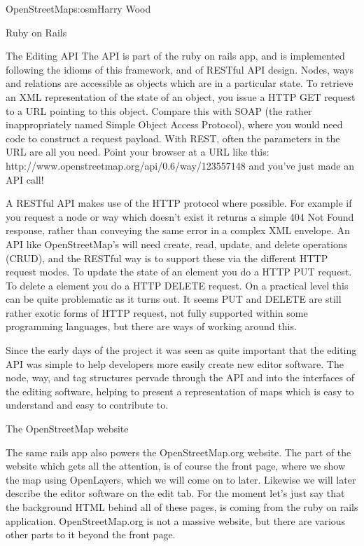 \begin{aosachapter}{OpenStreetMap}{s:osm}{Harry Wood}
\begin{aosasect1}{Ruby on Rails}
\begin{aosasect2}{The Editing API}
The API is part of the ruby on rails app, and is implemented following
the idioms of this framework, and of RESTful API design. Nodes, ways
and relations are accessible as objects which are in a particular
state. To retrieve an XML representation of the state of an object,
you issue a HTTP GET request to a URL pointing to this object. Compare
this with SOAP (the rather inappropriately named Simple Object Access
Protocol), where you would need code to construct a request
payload. With REST, often the parameters in the URL are all you
need. Point your browser at a URL like this:
http://www.openstreetmap.org/api/0.6/way/123557148 and you've just
made an API call!

A RESTful API makes use of the HTTP protocol where possible. For
example if you request a node or way which doesn't exist it returns a
simple 404 Not Found response, rather than conveying the same error in
a complex XML envelope. An API like OpenStreetMap's will need create,
read, update, and delete operations (CRUD), and the RESTful way is to
support these via the different HTTP request modes. To update the
state of an element you do a HTTP PUT request. To delete a element you
do a HTTP DELETE request. On a practical level this can be quite
problematic as it turns out. It seems PUT and DELETE are still rather
exotic forms of HTTP request, not fully supported within some
programming languages, but there are ways of working around this.

Since the early days of the project it was seen as quite important
that the editing API was simple to help developers more easily create
new editor software. The node, way, and tag structures pervade through
the API and into the interfaces of the editing software, helping to
present a representation of maps which is easy to understand and easy
to contribute to.

\end{aosasect2}

\begin{aosasect2}{The OpenStreetMap website}

The same rails app also powers the OpenStreetMap.org website. The part
of the website which gets all the attention, is of course the front
page, where we show the map using OpenLayers, which we will come on to
later. Likewise we will later describe the editor software on the edit
tab. For the moment let's just say that the background HTML behind all
of these pages, is coming from the ruby on rails
application. OpenStreetMap.org is not a massive website, but there are
various other parts to it beyond the front page.


\end{aosasect2}
\end{aosasect1}
\end{aosachapter}
